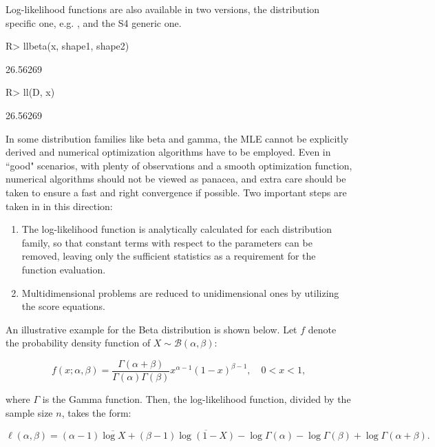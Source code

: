 \documentclass[nojss]{jss}
\newcommand{\fct}[1]{\code{#1()}}
\begin{document}
Log-likelihood functions are also available in two versions, the distribution specific one, e.g. \fct{llbeta}, and the \fct{ll} S4 generic one.

\begin{Schunk}
\begin{Sinput}
R> llbeta(x, shape1, shape2)
\end{Sinput}
\begin{Soutput}
[1] 26.56269
\end{Soutput}
\begin{Sinput}
R> ll(D, x)
\end{Sinput}
\begin{Soutput}
[1] 26.56269
\end{Soutput}
\end{Schunk}

In some distribution families like beta and gamma, the MLE cannot be explicitly derived and numerical optimization algorithms have to be employed. Even in ``good" scenarios, with plenty of observations and a smooth optimization function, numerical algorithms should not be viewed as panacea, and extra care should be taken to ensure a fast and right convergence if possible. Two important steps are taken in  in this direction:

\begin{enumerate}
  \item The log-likelihood function is analytically calculated for each distribution family, so that constant terms with respect to the parameters can be removed, leaving only the sufficient statistics as a requirement for the function evaluation.
  \item Multidimensional problems are reduced to unidimensional ones by utilizing the score equations.
\end{enumerate}

An illustrative example for the Beta distribution is shown below. Let $f$ denote the probability density function of $X\sim\mathcal{B}(\alpha,\beta)$:

\[
f(x; \alpha, \beta) = \frac{\Gamma(\alpha + \beta)}{\Gamma(\alpha) \Gamma(\beta)}x^{\alpha-1} (1 - x)^{\beta-1}, \quad 0 < x < 1,
\]

where \( \Gamma \) is the Gamma function. Then, the log-likelihood function, divided by the sample size $n$, takes the form:

\[
\ell(\alpha, \beta) = (\alpha - 1) \overline{\log X} + (\beta - 1) \overline{\log (1 - X)} - \log \Gamma(\alpha) - \log \Gamma(\beta) + \log \Gamma(\alpha + \beta).
\]
\end{document}

